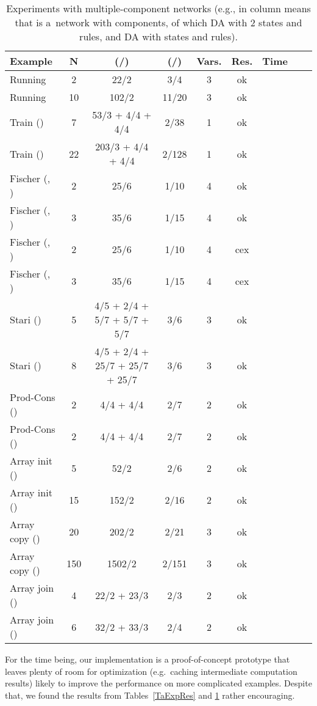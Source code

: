 \documentclass{llncs}
\begin{document}
\begin{table}[t]
\begin{center}
{\fontsize{8}{9}\selectfont
  \caption{Experiments with multiple-component networks (e.g.,
     in column  means that
     is a~network with  components, of which  DA with 2 states
    and  rules, and  DA with  states and  rules).}
\label{TaExpResProd}
\begin{tabular}{||l|c|c|c|c|c|c||c|c||}
  \hline
  Example & N & (/) &  (/) & Vars. & Res.  & Time \\
  \hline \hline
Running & 2 & 22/2  & 3/4& 3 &ok & \\
\hline
Running & 10 & 102/2  & 11/20& 3 &ok & \\
\hline
Train () & 7 & 53/3 + 4/4 + 4/4  & 2/38& 1 &ok & \\
\hline
Train () & 22 & 203/3 + 4/4 + 4/4  & 2/128& 1 &ok & \\
\hline
Fischer (, )  & 2 & 25/6  & 1/10& 4 &ok & \\
\hline
Fischer (, )  & 3 & 35/6  & 1/15& 4 &ok & \\
\hline
Fischer (, )  & 2 & 25/6  & 1/10& 4 &cex & \\
\hline
Fischer (, )  & 3 & 35/6  & 1/15& 4 &cex & \\
\hline
Stari ()  & 5 &  4/5 + 2/4 + 5/7 + 5/7 + 5/7  & 3/6 & 3&ok & \\
\hline
Stari ()  & 8 &  4/5 + 2/4 + 25/7 + 25/7 + 25/7  & 3/6 & 3&ok & \\
\hline
Prod-Cons ()  & 2 & 4/4 + 4/4  & 2/7 & 2 &ok & \\
\hline
Prod-Cons ()  & 2 & 4/4 + 4/4  & 2/7 & 2 &ok & \\
\hline
Array init () & 5 & 52/2  & 2/6 & 2 &ok & \\
\hline
Array init () & 15 & 152/2  & 2/16 & 2 &ok & \\
\hline
Array copy () & 20 & 202/2  & 2/21 & 3 &ok & \\
\hline
Array copy () & 150 & 1502/2  & 2/151 & 3 &ok & \\
\hline
Array join ()  & 4 & 22/2 + 23/3  & 2/3 & 2 &ok & \\
\hline
Array join ()  & 6 & 32/2 + 33/3  & 2/4 & 2 &ok & \\
\hline

\end{tabular}
}
\end{center}
\end{table}

For the time being, our implementation is a proof-of-concept prototype
that leaves plenty of room for optimization (e.g.\ caching
intermediate computation results) likely to improve the performance on
more complicated examples. Despite that, we found the results from
Tables~\ref{TaExpRes} and \ref{TaExpResProd} rather encouraging.
\end{document}
